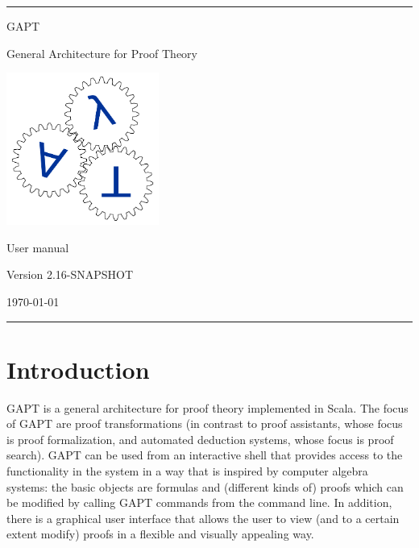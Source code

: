 \documentclass[a4paper,11pt]{book}
\begin{document}
\begin{titlepage}
\begin{center}

\hrule

\vspace*{20mm}

{\Huge GAPT}

\vspace*{5mm}

{\huge General Architecture for Proof Theory}

\vspace*{20mm}

\includegraphics[keepaspectratio,width=5cm]{logo}

\vspace*{20mm}

{\Huge User manual}

\vspace*{10mm}
{\Large Version 2.16-SNAPSHOT}
\vspace*{10mm}

{\Large \today}

\vspace*{20mm}

\hrule
\end{center}

\end{titlepage}

\listoffixmes

\setcounter{tocdepth}{1}
\tableofcontents

\chapter{Introduction}

GAPT is a general architecture for proof theory implemented in Scala.
The focus of GAPT are proof transformations (in contrast to proof assistants,
whose focus is proof formalization, and automated deduction systems, whose focus
is proof search).  GAPT can be used from an interactive shell that provides access to the functionality
in the system in a way that is inspired by computer algebra systems: the basic
objects are formulas and (different kinds of) proofs which can be modified
by calling GAPT commands from the command line. In addition, there
is a graphical user interface that allows the user to view (and to a certain
extent modify) proofs in a flexible and visually appealing way.
\end{document}
